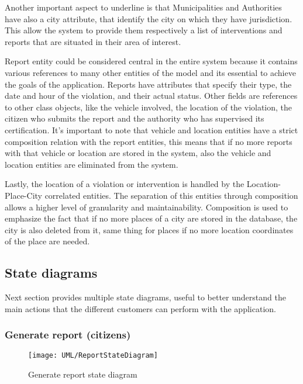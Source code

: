 Another important aspect to underline is that Municipalities and Authorities have also a city attribute, that identify the city on which they have jurisdiction. This allow the system to provide them respectively a list of  interventions and reports that are situated in their area of interest. 

Report entity could be considered central in the entire system because it contains various references to many other entities of the model and its essential to achieve the goals of the application. Reports have attributes that specify their type, the date and hour of the violation, and their actual status. Other fields are references to other class objects, like the vehicle involved, the location of the violation, the citizen who submits the report and the authority who has supervised its certification. It's important to note that vehicle and location entities have a strict composition relation with the report entities, this means that if no more reports with that vehicle or location are stored in the system, also the vehicle and location entities are eliminated from the system.

Lastly, the location of a violation or intervention is handled by the Location-Place-City correlated entities. The separation of this entities through composition allows a higher level of granularity and maintainability. Composition is used to emphasize the fact that if no more places of a city are stored in the database, the city is also deleted from it, same thing for places if no more location coordinates of the place are needed.

\subsection{State diagrams}

Next section provides multiple state diagrams, useful to better understand the main actions that the different customers can perform with the application.

\subsubsection{Generate report (citizens)}

\begin{figure}[H]
	\centering
	\texttt{[image: UML/ReportStateDiagram]}
	\caption{Generate report state diagram}
\end{figure}

